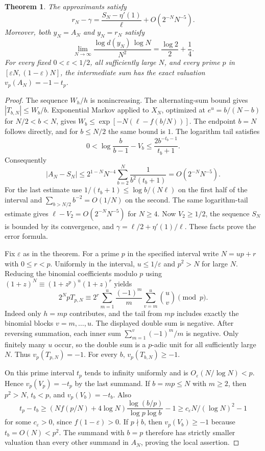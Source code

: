 \documentclass[11pt,a4paper,oneside,openany]{report}
\newtheorem{theorem}{Theorem}[section]
\theoremstyle{remark}\newtheorem{remark}[theorem]{Remark}
\numberwithin{equation}{section}
\begin{document}
\begin{theorem}\label{ch2:st:adaptiveheight}
The approximants satisfy
\[
 r_N-\gamma=\frac{S_N-\eta'(1)}{\ell}+O(2^{-N}N^{-5}).
\]
Moreover, both $y_N=A_N$ and $y_N=r_N$ satisfy
\[
 \lim_{N\to\infty}\frac{\log d(y_N)\,\log N}{N^2}
 =\frac{\log2}{2}+\frac14 .
\]
For every fixed $0<\varepsilon<1/2$, all sufficiently large $N$, and
every prime $p$ in $[\varepsilon N,(1-\varepsilon)N]$, the intermediate
sum has the exact valuation $v_p(A_N)=-1-t_p$.
\end{theorem}

\begin{proof}
The sequence $W_h/h$ is nonincreasing. The alternating-sum bound gives
$|T_{b,N}|\le W_b/b$. Exponential Markov applied to $X_N$, optimized
at $e^u=b/(N-b)$ for $N/2<b<N$, gives
$W_b\le\exp[-N(\ell-f(b/N))]$. The endpoint $b=N$ follows directly,
and for $b\le N/2$ the same bound is $1$. The logarithm tail satisfies
\[
 0<\log\frac b{b-1}-V_b\le \frac{2 b^{-t_b-1}}{t_b+1}.
\]
Consequently
\[
 |A_N-S_N|\le 2^{1-N}N^{-4}\sum_{b=2}^N\frac1{b^2(t_b+1)}
 =O(2^{-N}N^{-5}).
\]
For the last estimate use $1/(t_b+1)\le\log b/(N\ell)$ on the first
half of the interval and $\sum_{b>N/2}b^{-2}=O(1/N)$ on the second.
The same logarithm-tail estimate gives $\ell-V_2=O(2^{-N}N^{-5})$
for $N\ge4$. Now $V_2\ge1/2$, the sequence $S_N$ is bounded by its
convergence, and $\gamma=\ell/2+\eta'(1)/\ell$. These facts prove the
error formula.

Fix $\varepsilon$ as in the theorem. For a prime $p$ in the specified
interval write $N=up+r$ with $0\le r<p$. Uniformly in the interval,
$u\le1/\varepsilon$ and $p^2>N$ for large $N$. Reducing the binomial
coefficients modulo $p$ using $(1+z)^N\equiv(1+z^p)^u(1+z)^r$
yields
\[
 2^N p T_{p,N}\equiv 2^r
  \sum_{m=1}^{u}\frac{(-1)^m}{m}
                    \sum_{v=m}^{u}\binom uv\pmod p.
\]
Indeed only $h=mp$ contributes, and the tail from $mp$ includes
exactly the binomial blocks $v=m,\ldots,u$. The displayed double sum
is negative. After reversing summation, each inner
sum $\sum_{m=1}^v(-1)^m/m$ is negative. Only finitely many $u$ occur,
so the double sum is a $p$-adic unit for all sufficiently large $N$.
Thus $v_p(T_{p,N})=-1$. For every $b$, $v_p(T_{b,N})\ge-1$.

On this prime interval $t_p$ tends to infinity uniformly and is
$O_\varepsilon(N/\log N)<p$. Hence $v_p(V_p)=-t_p$ by the last
summand. If $b=mp\le N$ with $m\ge2$, then $p^2>N$,
$t_b<p$, and $v_p(V_b)=-t_b$. Also
\[
 t_p-t_b\ge
 (Nf(p/N)+4\log N)\frac{\log(b/p)}{\log p\log b}-1
 \ge c_\varepsilon N/(\log N)^2-1
\]
for some $c_\varepsilon>0$, since $f(1-\varepsilon)>0$.
If $p\nmid b$, then $v_p(V_b)\ge-1$ because $t_b=O(N)<p^2$.
The summand with $b=p$ therefore has strictly smaller valuation than
every other summand in $A_N$, proving the local assertion.


\end{proof}
\end{document}
